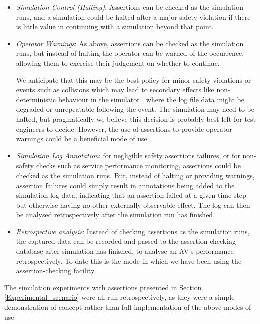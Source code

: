 	
	\begin{itemize}
		\item \emph{Simulation Control (Halting)}: Assertions can be checked as the simulation runs, and a simulation could be halted after a major safety violation if there is little value in continuing with a simulation beyond that point.
		
		\item \emph{Operator Warnings}: As above, assertions can be checked as the simulation runs, but instead of halting the operator can be warned of the occurrence, allowing them to exercise their judgement on whether to continue.
		
		We anticipate that this may be the best policy for minor safety violations or events such as collisions which may lead to secondary effects like non-deterministic behaviour in the simulator \cite{chance2021}, where the log file data might be degraded or unrepeatable following the event. The simulation may need to be halted, but pragmatically we believe this decision is probably best left for test engineers to decide. However, the use of assertions to provide operator warnings could be a beneficial mode of use.
		
		\item \emph{Simulation Log Annotation}: for negligible safety assertions failures, or for non-safety checks such as service performance monitoring, assertions could be checked as the simulation runs. But, instead of halting or providing warnings, assertion failures could simply result in annotations being added to the simulation log data, indicating that an assertion failed at a given time step but otherwise having no other externally observable effect. The log can then be analysed retrospectively after the simulation run has finished.
		
		\item \emph{Retrospective analysis}: Instead of checking assertions as the simulation runs, the captured data can be recorded and passed to the assertion checking database after simulation has finished, to analyse an AV's performance retrospectively. To date this is the mode in which we have been using the assertion-checking facility.
	\end{itemize}

	The simulation experiments with assertions presented in Section \ref{Experimental_scenario} were all run retrospectively, as they were a simple demonstration of concept rather than full implementation of the above modes of use. %


